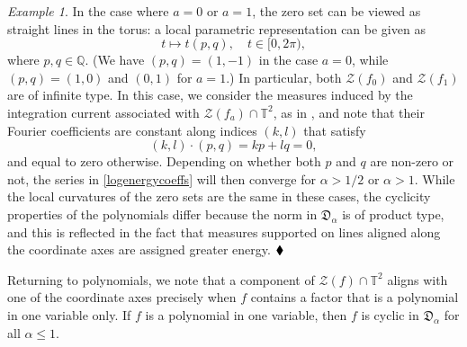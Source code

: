 \documentclass[11 pt,reqno]{amsart}
\theoremstyle{definition}
\theoremstyle{remark}
\newtheorem{ex}{Example}
\numberwithin{equation}{section} \numberwithin{figure}{section}
\begin{document}
\begin{ex}
In the case where $a=0$ or $a=1$, the zero set can be viewed as straight lines in the torus: a local parametric
representation can be given as
\[t\mapsto t(p,q), \quad t\in [0,2\pi),\]
where $p,q\in \mathbb{Q}$.
(We have $(p,q)=(1,-1)$ in the case $a=0$, while $(p,q)=(1,0)$ and $(0,1)$ for $a=1$.)
In particular, both $\mathcal{Z}(f_0)$ and $\mathcal{Z}(f_1)$
are of infinite type. In this case, we consider the measures
induced by the integration current associated with $\mathcal{Z}(f_a)\cap \mathbb{T}^2$, as in \cite[Section 4.2]{BCLSS13II}, and note that their Fourier coefficients are constant along indices $(k,l)$ that satisfy
\[(k,l)\cdot (p,q)=kp+lq=0,\]
and equal to zero otherwise. Depending on whether both $p$ and $q$ are
non-zero or not, the series in \eqref{logenergycoeffs} will then
converge for $\alpha>1/2$ or $\alpha>1$. While the local curvatures of
the zero sets are the same in these cases, the cyclicity properties of
the polynomials differ because the norm in $\mathfrak{D}_{\alpha}$ is
of product type, and this is reflected in the fact that measures
supported on lines aligned along the coordinate axes are assigned
greater energy. $\hfill\blacklozenge$ 
\end{ex} 
Returning to polynomials, we note that a component of $\mathcal{Z}(f)\cap \mathbb{T}^2$ aligns with one of the coordinate axes precisely when $f$ contains a factor that is a polynomial in one variable only. If $f$ is a polynomial in one variable,
then $f$ is cyclic in $\mathfrak{D}_{\alpha}$ for all $\alpha \leq 1$.
\end{document}
